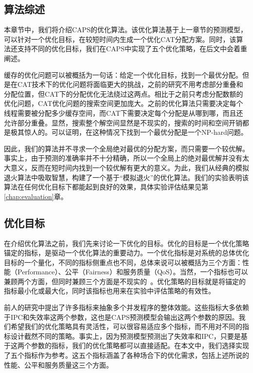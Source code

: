 \subsection{算法综述}

本章节中，我们将介绍CAPS的优化算法。该优化算法基于上一章节的预测模型，可以针对一个优化目标，在较短时间内生成一个优化CAT分配方案。同时，该算法还支持不同的优化目标，我们在CAPS中实现了五个优化策略，在后文中会着重阐述。

缓存的优化问题可以被概括为一句话：给定一个优化目标，找到一个最优分配。但是在CAT技术下的优化问题将面临更大的挑战，之前的研究不用考虑部分重叠和分配位置，但CAT下的分配优化无法绕过这两点。相比于之前只考虑分配数额的优化问题，CAT优化问题的搜索空间更加庞大。之前的优化算法只需要决定每个线程需要被分配多少缓存空间，而CAT下需要决定每个分配是从哪到哪，而且还允许部分重叠。显然，搜索整个解空间显然是不现实的，搜索的时间和空间开销都是极其惊人的。可以证明，在这种情况下找到一个最优分配是一个NP-hard问题。

因此，我们的算法并不寻求一个全局绝对最优的分配方案，而只需要一个较优解。事实上，由于预测的准确率并不十分精确，所以一个全局上的绝对最优解并没有太大意义，反而在短时间内找到一个较优解有更大的意义。为此，我们从经典的模拟退火算法中吸取智慧，构建了一个基于“模拟退火”的优化算法。我们的实验表明该算法在任何优化目标下都能起到良好的效果，具体实验评估结果见第\ref{chap:evaluation}章。

\subsection{优化目标} \label{sec:opt_goals}

在介绍优化算法之前，我们先来讨论一下优化的目标。优化的目标是一个优化策略锚定的指标，是驱动一个优化算法的重要动力。一个优化指标是对系统的总体优化目标的一个量化，不同的指标侧重点也不同，总体来说可以被概括为三个方面：性能（Performance）、公平（Fairness）和服务质量（QoS）。当然，一个指标也可以兼顾两个方面，但同时兼顾三个方面是不现实的~\parencite{hsu2006communist}。优化策略的目标就是将锚定的指标最小化或最大化，同时该指标也用来在实验中评估策略的有效性。

前人的研究中提出了许多指标来抽象多个并发程序的整体效能。这些指标大多依赖于IPC和失效率这两个参数，这也是CAPS预测模型会输出这两个参数的原因。我们希望我们的优化策略具有灵活性，可以很容易适应多个指标，而不用对不同的指标设计截然不同的策略。事实上，因为预测模型预测出了失效率和IPC，只要是基于这两个参数的指标，我们的优化策略都可以直接适配。在本文中，我们选择实现了五个指标作为参考。这五个指标涵盖了各种场合下的优化需求，包括上述所说的性能、公平和服务质量这三个方面。

